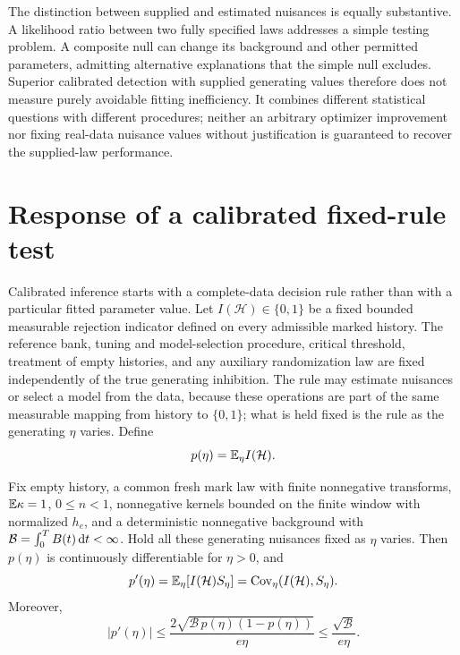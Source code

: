 The distinction between supplied and estimated nuisances is equally substantive. A likelihood ratio between two fully specified laws addresses a simple testing problem. A composite null can change its background and other permitted parameters, admitting alternative explanations that the simple null excludes. Superior calibrated detection with supplied generating values therefore does not measure purely avoidable fitting inefficiency. It combines different statistical questions with different procedures; neither an arbitrary optimizer improvement nor fixing real-data nuisance values without justification is guaranteed to recover the supplied-law performance.

\section{Response of a calibrated fixed-rule test}

Calibrated inference starts with a complete-data decision rule rather than with a particular fitted parameter value. Let \(I(\mathcal H)\in\{0,1\}\) be a fixed bounded measurable rejection indicator defined on every admissible marked history. The reference bank, tuning and model-selection procedure, critical threshold, treatment of empty histories, and any auxiliary randomization law are fixed independently of the true generating inhibition. The rule may estimate nuisances or select a model from the data, because these operations are part of the same measurable mapping from history to \(\{0,1\}\); what is held fixed is the rule as the generating \(\eta\) varies. Define
\[
p(\eta)=\mathbb{E} _\eta I(\mathcal H).
\]

\begin{proposition}
\label{prop:power_response}
Fix empty history, a common fresh mark law with finite nonnegative transforms, \(\mathbb{E} \kappa=1\), \(0\le n<1\), nonnegative kernels bounded on the finite window with normalized \(h_e\), and a deterministic nonnegative background with \(\mathcal B=\int_0^TB(t)\mathop{}\!\mathrm{d} t<\infty\). Hold all these generating nuisances fixed as \(\eta\) varies. Then \(p(\eta)\) is continuously differentiable for \(\eta>0\), and
\[
p'(\eta)=\mathbb{E} _\eta[I(\mathcal H)S_\eta]
=\mathrm{Cov}_\eta(I(\mathcal H),S_\eta).
\]
Moreover,
\[
|p'(\eta)|
\le
\frac{2\sqrt{\mathcal B\,p(\eta)(1-p(\eta))}}{e\eta}
\le
\frac{\sqrt{\mathcal B}}{e\eta}.
\]
\end{proposition}


